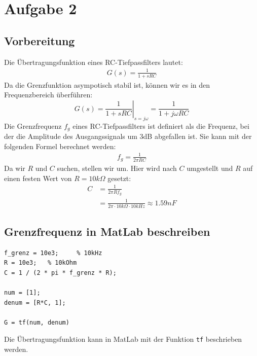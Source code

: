 \section{Aufgabe 2}
\subsection{Vorbereitung}
Die Übertragungsfunktion eines RC-Tiefpassfilters lautet:
\begin{align}
    G(s) = \frac{1}{1 + sRC}
\end{align}
Da die Grenzfunktion asympotisch stabil ist, können wir es in den Frequenzbereich überführen:
\begin{equation}
    G(s) = \left. \frac{1}{1 + sRC} \right|_{s = j\omega} = \frac{1}{1 + j\omega RC}
\end{equation}
Die Grenzfrequenz $f_g$ eines RC-Tiefpassfilters ist definiert als die Frequenz, bei der die Amplitude des Ausgangssignals um 3dB abgefallen ist. 
Sie kann mit der folgenden Formel berechnet werden:
\begin{align}
    f_g = \frac{1}{2 \pi RC}
\end{align}
Da wir $R$ und $C$ suchen, stellen wir um. Hier wird nach $C$ umgestellt und $R$ auf einen festen Wert von $R = 10 k\Omega$ gesetzt:
\begin{align}
    C &= \frac{1}{2 \pi R f_g} \\
    &= \frac{1}{2 \pi \cdot 10 k\Omega \cdot 10 kHz} \approx 1.59 nF
\end{align}

\subsection{Grenzfrequenz in MatLab beschreiben}
\begin{sourcecode}[H]
    \caption{Matlab Code zur Beschreibung der Übertragungsfunktion}
\begin{verbatim}
f_grenz = 10e3;     % 10kHz
R = 10e3;   % 10kOhm
C = 1 / (2 * pi * f_grenz * R);

num = [1];
denum = [R*C, 1];

G = tf(num, denum)
\end{verbatim}
\label{code:tran_fun}
\end{sourcecode}

Die Übertragungsfunktion kann in MatLab mit der Funktion \texttt{tf} beschrieben werden.


